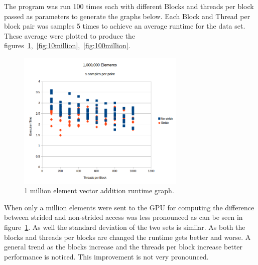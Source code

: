\documentclass[letterpaper,twocolumn]{article}
\begin{document}
The program was run 100 times each with different Blocks and threads per block passed as parameters to generate the graphs below. Each Block and Thread per block pair was samples 5 times to achieve an average runtime for the data set. These average were plotted to produce the figures~\ref{fig:1million},~\ref{fig:10million},~\ref{fig:100million}.
\begin{figure}
 \centering
 \includegraphics[width=8cm]{1000000_graph.png}
 \caption{1 million element vector addition runtime graph.}
 \label{fig:1million}
\end{figure}
When only a million elements were sent to the GPU for computing the difference between strided and non-strided access was less pronounced as can be seen in figure~\ref{fig:1million}. As well the standard deviation of the two sets is similar. As both the blocks and threads per blocks are changed the runtime gets better and worse. A general trend as the blocks increase and the threads per block increase better performance is noticed. This improvement is not very pronounced.
\end{document}
